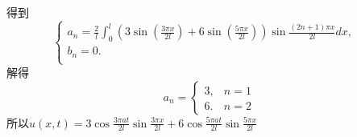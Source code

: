 \documentclass[11pt]{article}
\begin{document}
\begin{enumerate}
    得到\begin{equation*}
            \left\{
             \begin{array}{lr}
             a_n=\frac{2}{l}\int_0^l(3\sin(\frac{3\pi x}{2l})+6\sin(\frac{5\pi x}{2l}))\sin\frac{(2n+1)\pi x}{2l}dx, &  \\
             b_n=0. & \\
             \end{array}
            \right.
            \end{equation*}
    解得\begin{equation*}
            a_n=\begin{cases}
                    3,& n=1\\
                    6.&n=2
            \end{cases}
            \end{equation*}
    所以$u(x,t)=3\cos\frac{3\pi at}{2l}\sin\frac{3\pi x}{2l}+6\cos\frac{5\pi at}{2l}\sin\frac{5\pi x}{2l}$



\end{enumerate}
\end{document}
